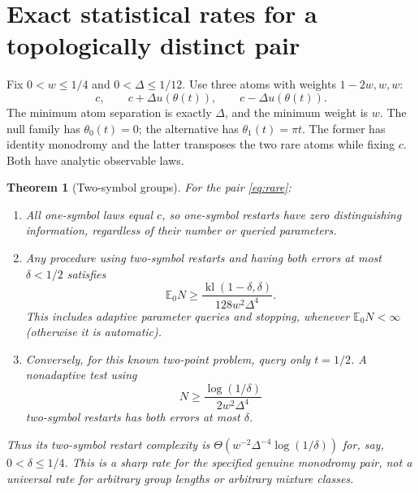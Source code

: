 \documentclass[11pt]{article}
\newtheorem{theorem}{Theorem}[section]
\theoremstyle{remark}\newtheorem{remark}[theorem]{Remark}
\newcommand{\kl}{\operatorname{kl}}
\begin{document}
\section{Exact statistical rates for a topologically distinct pair}
Fix $0<w\leq1/4$ and $0<\Delta\leq1/12$. Use three atoms with weights $1-2w,w,w$:
\begin{equation}\label{eq:rare}
 c,\qquad c+\Delta u(\theta(t)),\qquad c-\Delta u(\theta(t)).
\end{equation}
The minimum atom separation is exactly $\Delta$, and the minimum weight is $w$. The null family has $\theta_0(t)=0$; the alternative has $\theta_1(t)=\pi t$. The former has identity monodromy and the latter transposes the two rare atoms while fixing $c$. Both have analytic observable laws.

\begin{theorem}[Two-symbol groups]\label{thm:stat-pair}
For the pair \eqref{eq:rare}:
\begin{enumerate}
\item All one-symbol laws equal $c$, so one-symbol restarts have zero distinguishing information, regardless of their number or queried parameters.
\item Any procedure using two-symbol restarts and having both errors at most $\delta<1/2$ satisfies
\begin{equation}\label{eq:statlower}
 \mathbb E_0N\geq\frac{\kl(1-\delta,\delta)}{128w^2\Delta^4}.
\end{equation}
This includes adaptive parameter queries and stopping, whenever $\mathbb E_0N<\infty$ (otherwise it is automatic).
\item Conversely, for this known two-point problem, query only $t=1/2$. A nonadaptive test using
\begin{equation}\label{eq:statupper}
 N\geq\frac{\log(1/\delta)}{2w^2\Delta^4}
\end{equation}
two-symbol restarts has both errors at most $\delta$.
\end{enumerate}
Thus its two-symbol restart complexity is $\Theta(w^{-2}\Delta^{-4}\log(1/\delta))$ for, say, $0<\delta\leq1/4$. This is a sharp rate for the specified genuine monodromy pair, not a universal rate for arbitrary group lengths or arbitrary mixture classes.
\end{theorem}
\end{document}
